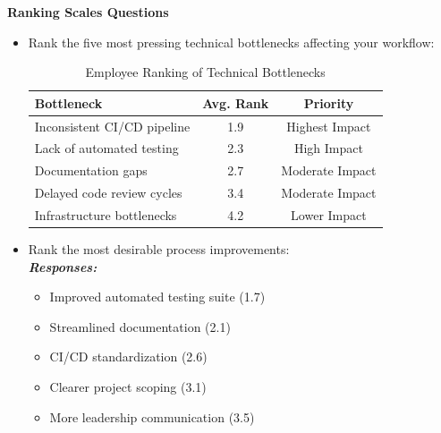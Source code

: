 \documentclass[12pt,a4paper,oneside]{book}
\begin{document}
\textbf{Ranking Scales Questions}
\begin{itemize}
  \item Rank the five most pressing technical bottlenecks affecting your workflow:

  \begin{table}[H]
  \centering
  \caption{Employee Ranking of Technical Bottlenecks}
  
  \begin{tabular}{|l|c|c|}
  \hline
  Bottleneck & Avg. Rank & Priority \\
  \hline
  Inconsistent CI/CD pipeline & 1.9 & Highest Impact \\
  Lack of automated testing & 2.3 & High Impact \\
  Documentation gaps & 2.7 & Moderate Impact \\
  Delayed code review cycles & 3.4 & Moderate Impact \\
  Infrastructure bottlenecks & 4.2 & Lower Impact \\
  \hline
  \end{tabular}
  \end{table}


\newpage
\item Rank the most desirable process improvements: \\
\textbf{\textit{Responses:}}

  \begin{itemize}
    \item Improved automated testing suite (1.7)
    \item Streamlined documentation (2.1)
    \item CI/CD standardization (2.6)
    \item Clearer project scoping (3.1)
    \item More leadership communication (3.5)
  \end{itemize}
\end{itemize}
\end{document}

